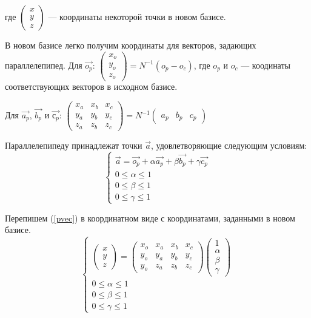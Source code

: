 \documentclass[pdftex,ptm,12pt,a4paper]{report}
\begin{document}
      где $\begin{pmatrix} x \\ y \\ z \end{pmatrix}$ --- координаты некоторой точки в новом базисе.

      В новом базисе легко получим координаты для векторов, задающих параллелепипед.
      Для $\vec{o_p}$:
      $\begin{pmatrix} x_o \\ y_o \\ z_o \end{pmatrix} =  N^{-1} (o_p - o_c) $, где $o_p$ и $o_c$ --- коодинаты соответствующих векторов в исходном базисе.

      Для $\vec{a_p}$, $\vec{b_p}$ и $\vec{с_p}$:
      $\begin{pmatrix} x_a & x_b & x_c \\ y_a & y_b & y_c  \\ z_a & z_b & z_c \end{pmatrix} =
      N^{-1} \begin{pmatrix} a_p & b_p  & c_p \end{pmatrix}$

      Параллелепипеду принадлежат точки $\vec{a}$, удовлетворяющие следующим условиям:
      \begin{equation}\label{pvec}
        \begin{cases}
          \vec{a} = \vec{o_p} + \alpha \vec{a_p} + \beta \vec{b_p} + \gamma \vec{c_p} \\
          0 \le  \alpha   \le  1 \\
          0 \le  \beta   \le  1 \\
          0 \le  \gamma   \le  1
        \end{cases}
      \end{equation}

      Перепишем (\ref{pvec}) в координатном виде с координатами, заданными в новом базисе.
      \begin{equation}\label{pcoord}
        \begin{cases}
          \begin{pmatrix} x \\ y \\ z \end{pmatrix}
          =
          \begin{pmatrix} x_o & x_a & x_b & x_c \\ y_o & y_a & y_b & y_c  \\ y_o & z_a & z_b & z_c
          \end{pmatrix} \begin {pmatrix} 1 \\ \alpha \\ \beta \\ \gamma \end{pmatrix} \\
          0 \le  \alpha   \le  1 \\
          0 \le  \beta   \le  1 \\
          0 \le  \gamma   \le  1
        \end{cases}
      \end{equation}
\end{document}
